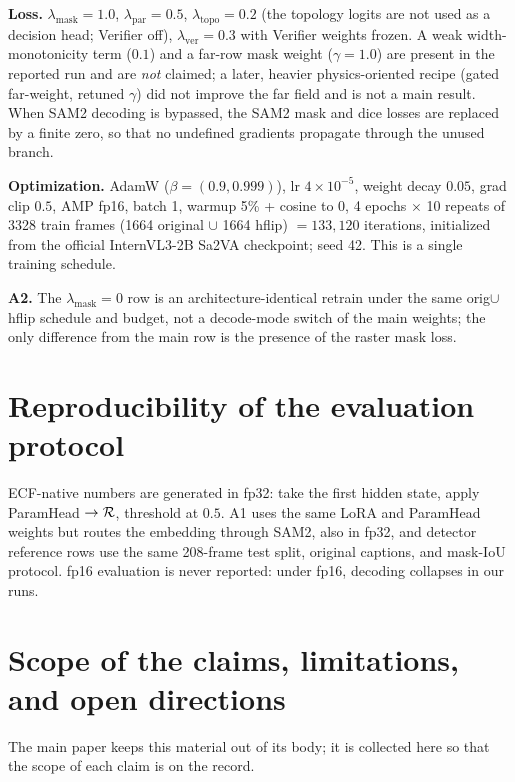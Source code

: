 \textbf{Loss.} $\lambda_{\mathrm{mask}}{=}1.0$, $\lambda_{\mathrm{par}}{=}0.5$, $\lambda_{\mathrm{topo}}{=}0.2$ (the topology logits are not used as a decision head; Verifier off), $\lambda_{\mathrm{ver}}{=}0.3$ with Verifier weights frozen.
A weak width-monotonicity term ($0.1$) and a far-row mask weight ($\gamma{=}1.0$) are present in the reported run and are \emph{not} claimed; a later, heavier physics-oriented recipe (gated far-weight, retuned $\gamma$) did not improve the far field and is not a main result.
When SAM2 decoding is bypassed, the SAM2 mask and dice losses are replaced by a finite zero, so that no undefined gradients propagate through the unused branch.

\textbf{Optimization.} AdamW ($\beta{=}(0.9,0.999)$), lr $4{\times}10^{-5}$, weight decay $0.05$, grad clip $0.5$, AMP fp16, batch 1, warmup 5\% + cosine to 0, 4 epochs $\times$ 10 repeats of 3328 train frames (1664 original $\cup$ 1664 hflip) $= 133{,}120$ iterations, initialized from the official InternVL3-2B Sa2VA checkpoint; seed 42.
This is a single training schedule.

\textbf{A2.} The $\lambda_{\mathrm{mask}}{=}0$ row is an architecture-identical retrain under the same orig$\cup$hflip schedule and budget, not a decode-mode switch of the main weights; the only difference from the main row is the presence of the raster mask loss.

\section{Reproducibility of the evaluation protocol}
\label{app:repro}

ECF-native numbers are generated in fp32: take the first \Seg{} hidden state, apply ParamHead $\to \mathcal{R}$, threshold at $0.5$.
A1 uses the same LoRA and ParamHead weights but routes the \Seg{} embedding through SAM2, also in fp32, and detector reference rows use the same 208-frame test split, original captions, and mask-IoU protocol.
fp16 evaluation is never reported: under fp16, \Seg{} decoding collapses in our runs.

\section{Scope of the claims, limitations, and open directions}
\label{app:limits}

The main paper keeps this material out of its body; it is collected here so that the scope of each claim is on the record.

